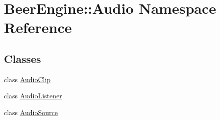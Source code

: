 \hypertarget{namespace_beer_engine_1_1_audio}{}\section{Beer\+Engine\+:\+:Audio Namespace Reference}
\label{namespace_beer_engine_1_1_audio}
\subsection*{Classes}
\begin{DoxyCompactItemize}
\item 
class \mbox{\hyperlink{class_beer_engine_1_1_audio_1_1_audio_clip}{Audio\+Clip}}
\item 
class \mbox{\hyperlink{class_beer_engine_1_1_audio_1_1_audio_listener}{Audio\+Listener}}
\item 
class \mbox{\hyperlink{class_beer_engine_1_1_audio_1_1_audio_source}{Audio\+Source}}
\end{DoxyCompactItemize}
